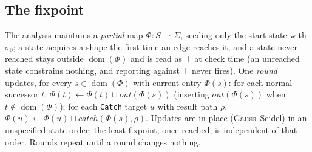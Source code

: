 \documentclass[11pt]{article}
\newcommand{\dom}{\operatorname{dom}}
\theoremstyle{plain}
\theoremstyle{definition}
\theoremstyle{remark}
\begin{document}
\subsection{The fixpoint}

The analysis maintains a \emph{partial} map $\Phi:S\rightharpoonup\Sigma$, seeding only the
start state with $\sigma_0$; a state acquires a shape the first time an edge reaches it, and a
state never reached stays outside $\dom(\Phi)$ and is read as $\top$ at check time (an
unreached state constrains nothing, and reporting against $\top$ never fires). One \emph{round}
updates, for every $s\in\dom(\Phi)$ with current entry $\Phi(s)$: for each normal successor
$t$, $\Phi(t)\leftarrow\Phi(t)\sqcup\mathit{out}(\Phi(s))$ (inserting $\mathit{out}(\Phi(s))$
when $t\notin\dom(\Phi)$); for each \texttt{Catch} target $u$ with result path $\rho$,
$\Phi(u)\leftarrow\Phi(u)\sqcup\mathit{catch}(\Phi(s),\rho)$. Updates are in place
(Gauss--Seidel) in an unspecified state order; the least fixpoint, once reached, is independent
of that order. Rounds repeat until a round changes nothing.
\end{document}
